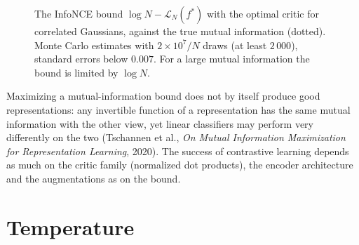 \begin{notechapter}
\begin{figure}[ht]
\centering
{}
\caption{The InfoNCE bound $\log N - \mathcal L_N(f^*)$ with the optimal critic for correlated Gaussians, against the true mutual
information (dotted). Monte Carlo estimates with $2\times10^7/N$ draws (at least $2\,000$), standard errors below
$0.007$. For a large mutual information the bound is limited by $\log N$.}
\label{contrastive-learning:fig:gauss}
\end{figure}

\begin{remark}
Maximizing a mutual-information bound does not by itself produce good representations:
any invertible function of a representation has the same mutual information with the other
view, yet linear classifiers may perform very differently on the two (Tschannen et al., \emph{On
Mutual Information Maximization for Representation Learning}, 2020). The success of
contrastive learning depends as much on the critic family (normalized dot products), the
encoder architecture and the augmentations as on the bound.
\end{remark}

\section{Temperature}\label{contrastive-learning:sec:temperature}


\end{notechapter}
